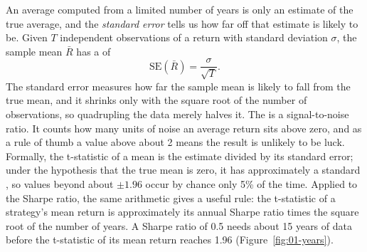 An average computed from a limited number of years is only an estimate of the true average, and the \emph{standard error} tells us how far off that estimate is likely to be. Given $T$ independent observations of a return with standard deviation $\sigma$, the sample mean $\bar{R}$ has a  of
\begin{equation}
  \mathrm{SE}(\bar{R}) = \frac{\sigma}{\sqrt{T}}.
  \label{eq:01-se}
\end{equation}
The standard error measures how far the sample mean is likely to fall from the true mean, and it shrinks only with the square root of the number of observations, so quadrupling the data merely halves it. The  is a signal-to-noise ratio. It counts how many units of noise an average return sits above zero, and as a rule of thumb a value above about 2 means the result is unlikely to be luck. Formally, the t-statistic of a mean is the estimate divided by its standard error; under the hypothesis that the true mean is zero, it has approximately a standard , so values beyond about $\pm 1.96$ occur by chance only 5\% of the time. Applied to the Sharpe ratio, the same arithmetic gives a useful rule: the t-statistic of a strategy's mean return is approximately its annual Sharpe ratio times the square root of the number of years. A Sharpe ratio of 0.5
needs about 15 years of data before the t-statistic of its mean return reaches 1.96 (Figure~\ref{fig:01-years}).




